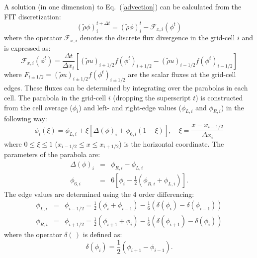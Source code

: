   A solution (in one dimension) to Eq.~(\ref{advection}) can be calculated
  from the FIT discretization:
  \begin{equation}
    \label{1DFIT}
    (\tilde{\rho} \phi)_{i}^{t+\Delta t} = (\tilde{\rho} \phi)_{i}^{t} -
    \mathcal{F}_{x,i}(\phi^{t})    
  \end{equation}
  where the operator $\mathcal{F}_{x,i}$ denotes the discrete flux
  divergence in the grid-cell $i$ and is expressed as:
  \begin{equation}
    \label{FIT}
    \mathcal{F}_{x,i}(\phi^{t}) = \frac{\Delta t}{\Delta x_{i}} \left[
      (\tilde{\rho} u)_{i+1/2} f(\phi^{t})_{i+1/2} - (\tilde{\rho} u)_{i-1/2}
      f(\phi^{t})_{i-1/2} \right] 
  \end{equation}
  where $F_{i\pm1/2}=(\tilde{\rho} u)_{i\pm1/2} f(\phi^{t})_{i\pm1/2}$ are the
  scalar fluxes at the grid-cell edges. These fluxes can be determined
  by integrating over the parabolas in each cell. The parabola in the
  grid-cell $i$ (dropping the superscript $t$) is constructed from the
  cell average ($\phi_{i}$) and left- and right-edge values ($\phi_{L,i}$
  and $\phi_{R,i}$) in the following way:
  \begin{equation}
    \label{par}
    \phi_{i}(\xi) = \phi_{L,i} + \xi \left[ \Delta(\phi)_{i} +
      \phi_{6,i} \left ( 1- \xi \right ) \right ], \quad \xi = \frac{x -
      x_{i-1/2}}{\Delta x_{i}}
  \end{equation}
  where $0 \le \xi \le 1$ ($x_{i-1/2} \le x \le x_{i+1/2}$) is the
  horizontal coordinate. The parameters of the parabola are:
  \begin{eqnarray}
    \Delta(\phi)_{i} & = & \phi_{R,i} - \phi_{L,i}\\
    \phi_{6,i} & = & 6 \left[\phi_{i} - \frac{1}{2}\left (\phi_{R,i} +
    \phi_{L,i} \right ) \right ].
  \end{eqnarray}
  The edge values are determined using the 4 order differencing:
  \begin{eqnarray}
    \label{edgevalues1}
    \phi_{L,i} &=& \phi_{i-1/2} = \frac{1}{2}\left ( \phi_{i} + \phi_{i-1}
    \right ) - \frac{1}{6}\left ( \delta(\phi_{i}) - \delta(\phi_{i-1})
    \right )\\
    \label{edgevalues2}
    \phi_{R,i} &=& \phi_{i+1/2} = \frac{1}{2}\left ( \phi_{i+1} + \phi_{i}
    \right ) - \frac{1}{6}\left ( \delta(\phi_{i+1}) - \delta(\phi_{i})
    \right )
  \end{eqnarray}
  where the operator $\delta(\,)$ is defined as:
  \begin{equation}
    \label{endpar}
    \delta(\phi_{i}) = \frac{1}{2} \left( \phi_{i+1} - \phi_{i-1} \right).
  \end{equation}  
